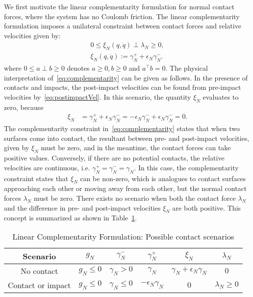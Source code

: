{We first motivate the linear complementarity formulation for normal contact
forces, where the system has no Coulomb friction.
% 
The linear complementarity formulation imposes a unilateral constraint between
contact forces and relative velocities given by:
\begin{equation}
  \begin{gathered}
    0 \leq 
      \xi_N(q, \dot{q}) 
      \perp
      \lambda_N  
      \geq 0, \\
      \xi_N(q, \dot{q}) := \gamma_N^+ + \epsilon_N \gamma_N^-.
  \end{gathered}
  \label{eq:complementarity} 
\end{equation}
\noindent where $0 \leq a \perp b \geq 0$ denotes $a \geq 0, b \geq 0$ and
$a^\top b=0$.
% 
The physical interpretation of~\eqref{eq:complementarity} can be given as
follows.
%
%
In the presence of contacts and impacts, the post-impact velocities can be found
from pre-impact velocities by~\eqref{eq:postimpactVel}.
%
In this scenario, the quantity $\xi_N$ evaluates to zero, because
\begin{align*}
  \xi_N &= \gamma_N^+ + \epsilon_N \gamma_N^- = -\epsilon_N \gamma_N^- + \epsilon_N \gamma_N^- = 0.
\end{align*}
%
The complementarity constraint in~\eqref{eq:complementarity} states that when
two surfaces come into contact, the resultant between pre- and post-impact
velocities, given by $\xi_N$ must be zero, and in the meantime, the contact
forces can take positive values.
%
Conversely, if there are no potential contacts, the relative velocities are
continuous, i.e. $\gamma_N^+ = \gamma_N^- = \gamma_N$.
%
In this case, the complementarity constraint states that $\xi_N$ can be
non-zero, which is analogues to contact surfaces approaching each other or
moving away from each other, but the normal contact forces $\lambda_N$ must be
zero. 
%
There exists no scenario when both the contact force $\lambda_N$ and the
difference in pre- and post-impact velocities $\xi_N$ are both positive.
%
This concept is summarized as shown in Table~\ref{tab:complementarity}.

\begin{table}
  \centering
  \caption{Linear Complementarity Formulation: Possible contact scenarios}
  \begin{tabular}{|c|c|c|c|c|c|}
    \hline
    Scenario & $g_N$ & $\gamma_N^-$ & $\gamma_N^+$ & $\xi_N$ & $\lambda_N$ \\
    \hline\hline
    No contact & $g_N \leq 0$  & $\gamma_N > 0$ & $\gamma_N$ & $ \gamma_N +\epsilon_N\gamma_N$ & $0$ \\
    Contact or impact & $g_N \leq 0$ &  $\gamma_N \leq 0$ & $- \epsilon_N \gamma_N$ & $0$ & $\lambda_N \geq 0$ \\
    \hline
  \end{tabular}
  \label{tab:complementarity}
\end{table}

}

